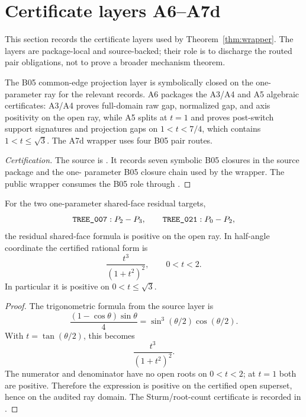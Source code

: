 \section{Certificate layers A6--A7d}
\label{sec:layers}

This section records the certificate layers used by Theorem~\ref{thm:wrapper}.
The layers are package-local and source-backed; their role is to discharge the
routed pair obligations, not to prove a broader mechanism theorem.

\begin{certprop}
The B05 common-edge projection layer is symbolically closed on the one-parameter
ray for the relevant records.  A6 packages the A3/A4 and A5 algebraic
certificates: A3/A4 proves full-domain raw gap, normalized gap, and axis
positivity on the open ray, while A5 splits at \(t=1\) and proves post-switch
support signatures and projection gaps on \(1<t<7/4\), which contains
\(1<t\le\sqrt3\).  The A7d wrapper uses four B05 pair routes.
\end{certprop}

\begin{proof}[Certification]
The source is
.
It records seven symbolic B05 closures in the source package and the one-
parameter B05 closure chain used by the wrapper.  The public wrapper consumes
the B05 role through .
\end{proof}

\begin{certprop}
For the two one-parameter shared-face residual targets,
\[
\texttt{TREE\_007}{}:P_2-P_3,
\qquad
\texttt{TREE\_021}{}:P_0-P_2,
\]
the residual shared-face formula is positive on the open ray.  In half-angle
coordinate the certified rational form is
\[
\frac{t^3}{(1+t^2)^2},
\qquad 0<t<2.
\]
In particular it is positive on \(0<t\le\sqrt3\).
\end{certprop}

\begin{proof}
The trigonometric formula from the source layer is
\[
\frac{(1-\cos\theta)\sin\theta}{4}
  =\sin^3(\theta/2)\cos(\theta/2).
\]
With \(t=\tan(\theta/2)\), this becomes
\[
\frac{t^3}{(1+t^2)^2}.
\]
The numerator and denominator have no open roots on \(0<t<2\); at \(t=1\) both
are positive.  Therefore the expression is positive on the certified open
superset, hence on the audited ray domain.  The Sturm/root-count certificate is
recorded in
.
\end{proof}

